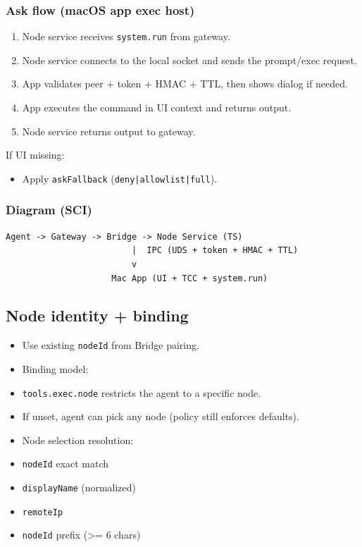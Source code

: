 \subsubsection{Ask flow (macOS app exec host)}


\begin{enumerate}
  \item Node service receives \texttt{system.run} from gateway.
  \item Node service connects to the local socket and sends the prompt/exec request.
  \item App validates peer + token + HMAC + TTL, then shows dialog if needed.
  \item App executes the command in UI context and returns output.
  \item Node service returns output to gateway.
\end{enumerate}


If UI missing:

\begin{itemize}
  \item Apply \texttt{askFallback} (\texttt{deny|allowlist|full}).
\end{itemize}


\subsubsection{Diagram (SCI)}


\begin{lstlisting}
Agent -> Gateway -> Bridge -> Node Service (TS)
                         |  IPC (UDS + token + HMAC + TTL)
                         v
                     Mac App (UI + TCC + system.run)
\end{lstlisting}


\subsection{Node identity + binding}


\begin{itemize}
  \item Use existing \texttt{nodeId} from Bridge pairing.
  \item Binding model:
  \item \texttt{tools.exec.node} restricts the agent to a specific node.
  \item If unset, agent can pick any node (policy still enforces defaults).
  \item Node selection resolution:
  \item \texttt{nodeId} exact match
  \item \texttt{displayName} (normalized)
  \item \texttt{remoteIp}
  \item \texttt{nodeId} prefix (>= 6 chars)
\end{itemize}


